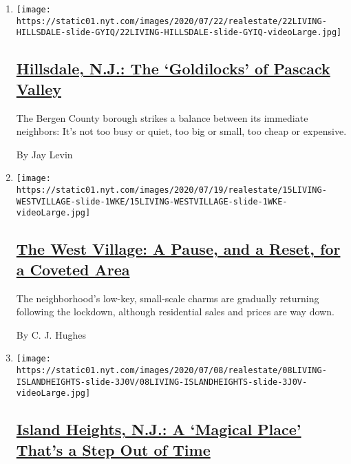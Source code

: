 \begin{enumerate}
\def\labelenumi{\arabic{enumi}.}
\item
  \texttt{[image: https://static01.nyt.com/images/2020/07/22/realestate/22LIVING-HILLSDALE-slide-GYIQ/22LIVING-HILLSDALE-slide-GYIQ-videoLarge.jpg]}

  \hypertarget{hillsdale-nj-the-goldilocks-of-pascack-valley}{%
  \subsection{\texorpdfstring{\href{/2020/07/22/realestate/hillsdale-nj-pascack-valley.html}{Hillsdale,
  N.J.: The `Goldilocks' of Pascack
  Valley}}{Hillsdale, N.J.: The `Goldilocks' of Pascack Valley}}\label{hillsdale-nj-the-goldilocks-of-pascack-valley}}

  The Bergen County borough strikes a balance between its immediate
  neighbors: It's not too busy or quiet, too big or small, too cheap or
  expensive.

  By Jay Levin
\item
  \texttt{[image: https://static01.nyt.com/images/2020/07/19/realestate/15LIVING-WESTVILLAGE-slide-1WKE/15LIVING-WESTVILLAGE-slide-1WKE-videoLarge.jpg]}

  \hypertarget{the-west-village-a-pause-and-a-reset-for-a-coveted-area}{%
  \subsection{\texorpdfstring{\href{/2020/07/15/realestate/west-village-nyc.html}{The
  West Village: A Pause, and a Reset, for a Coveted
  Area}}{The West Village: A Pause, and a Reset, for a Coveted Area}}\label{the-west-village-a-pause-and-a-reset-for-a-coveted-area}}

  The neighborhood's low-key, small-scale charms are gradually returning
  following the lockdown, although residential sales and prices are way
  down.

  By C. J. Hughes
\item
  \texttt{[image: https://static01.nyt.com/images/2020/07/08/realestate/08LIVING-ISLANDHEIGHTS-slide-3J0V/08LIVING-ISLANDHEIGHTS-slide-3J0V-videoLarge.jpg]}

  \hypertarget{island-heights-nj-a-magical-place-thats-a-step-out-of-time}{%
  \subsection{\texorpdfstring{\href{/2020/07/08/realestate/island-heights-nj-a-magical-place-thats-a-step-out-of-time.html}{Island
  Heights, N.J.: A `Magical Place' That's a Step Out of
  Time}}{Island Heights, N.J.: A `Magical Place' That's a Step Out of Time}}\label{island-heights-nj-a-magical-place-thats-a-step-out-of-time}}


\end{enumerate}
